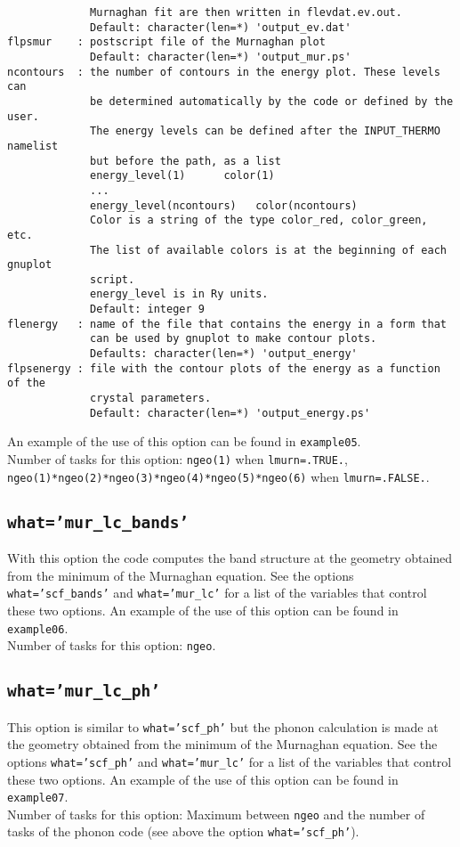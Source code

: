 \documentclass[12pt,a4paper]{article}
\begin{document}
\begin{verbatim}
             Murnaghan fit are then written in flevdat.ev.out.
             Default: character(len=*) 'output_ev.dat'
flpsmur    : postscript file of the Murnaghan plot
             Default: character(len=*) 'output_mur.ps'
ncontours  : the number of contours in the energy plot. These levels can
             be determined automatically by the code or defined by the user.
             The energy levels can be defined after the INPUT_THERMO namelist 
             but before the path, as a list
             energy_level(1)      color(1)
             ...
             energy_level(ncontours)   color(ncontours) 
             Color is a string of the type color_red, color_green, etc.
             The list of available colors is at the beginning of each gnuplot
             script.
             energy_level is in Ry units.
             Default: integer 9
flenergy   : name of the file that contains the energy in a form that
             can be used by gnuplot to make contour plots.
             Defaults: character(len=*) 'output_energy'
flpsenergy : file with the contour plots of the energy as a function of the
             crystal parameters.
             Default: character(len=*) 'output_energy.ps'
\end{verbatim}
An example of the use of this option can be found in \texttt{example05}.\\
Number of tasks for this option: 
\texttt{ngeo(1)} when \texttt{lmurn=.TRUE.}, \\
\texttt{ngeo(1)*ngeo(2)*ngeo(3)*ngeo(4)*ngeo(5)*ngeo(6)} when
\texttt{lmurn=.FALSE.}.


\subsection{\texttt{what='mur\_lc\_bands'}}
With this option the code computes the band structure at the geometry 
obtained from the minimum of the Murnaghan equation. See the options 
\texttt{what='scf\_bands'} and \texttt{what='mur\_lc'} for a list of 
the variables that control these two options. An example of the use of 
this option can be found in \texttt{example06}. \\
Number of tasks for this option: \texttt{ngeo}.

\subsection{\texttt{what='mur\_lc\_ph'}}
This option is similar to \texttt{what='scf\_ph'} but the phonon calculation
is made at the geometry obtained from the minimum of the Murnaghan equation.
See the options \texttt{what='scf\_ph'} and \texttt{what='mur\_lc'} for a
list of the variables that control these two options. 
An example of the use of this option can be found in \texttt{example07}. \\
Number of tasks for this option: Maximum between \texttt{ngeo} and the number
of tasks of the phonon code (see above the option \texttt{what='scf\_ph'}).
\end{document}
